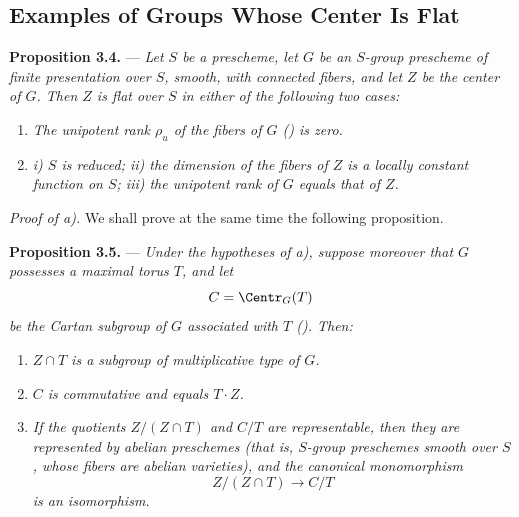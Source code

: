 \subsection*{Examples of Groups Whose Center Is Flat}

\noindent{}%
\textbf{Proposition 3.4.} --- \textit{Let \(S\) be a prescheme, let
\(G\) be an \(S\)-group prescheme of finite presentation over
\(S\), smooth, with connected fibers, and let \(Z\) be the center
of \(G\). Then \(Z\) is flat over \(S\) in either of the following
two cases:}

\begin{enumerate}
\renewcommand{\labelenumi}{\textit{\alph{enumi})}}
\item \textit{The unipotent rank \(\rho_u\) of the fibers of \(G\)
() is zero.}

\item \textit{i) \(S\) is reduced; \quad
ii) the dimension of the fibers of \(Z\) is a locally constant
function on \(S\); \quad
iii) the unipotent rank of \(G\) equals that of \(Z\).}
\end{enumerate}

\medskip
\noindent\textit{Proof of  a).}
We shall prove at the same time the following proposition.

\medskip
\noindent{}%
\textbf{Proposition 3.5.} --- \textit{Under the hypotheses of
 a), suppose moreover that \(G\) possesses a maximal torus \(T\),
and let}
\[
  C=\Centr_G(T)
\]
\textit{be the Cartan subgroup of \(G\) associated with \(T\)
(). Then:}

\begin{enumerate}
\renewcommand{\labelenumi}{\textit{(\roman{enumi})}}
\item \textit{\(Z\cap T\) is a subgroup of multiplicative type of
\(G\).}

\item \textit{\(C\) is commutative and equals \(T\cdot Z\).}

\item \textit{If the quotients \(Z/(Z\cap T)\) and \(C/T\) are
representable, then they are represented by abelian preschemes
(that is, \(S\)-group preschemes smooth over \(S\), whose fibers are
abelian varieties), and the canonical monomorphism}
\[
  Z/(Z\cap T)\longrightarrow C/T
\]
\textit{is an isomorphism.}
\end{enumerate}

